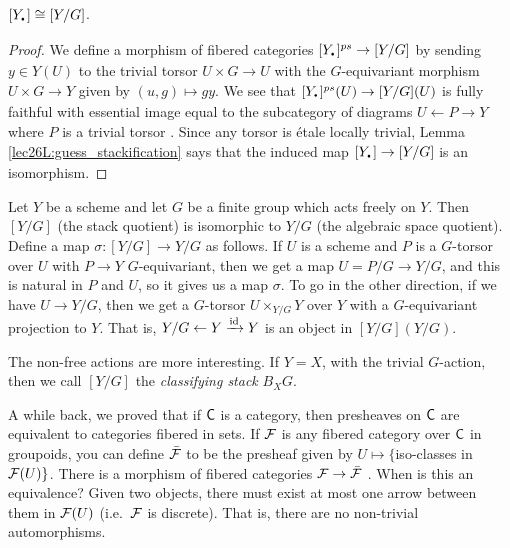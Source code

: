 \begin{proposition}
   $[Y_\udot]\cong [Y/G]$.
 \end{proposition}
 \begin{proof}
   We define a morphism of fibered categories $[Y_\udot]^{ps}\to [Y/G]$ by sending $y\in
   Y(U)$ to the trivial torsor $U\times G\to U$ with the $G$-equivariant morphism
   $U\times G\to Y$ given by $(u,g)\mapsto gy$. We see that $[Y_\udot]^{ps}(U)\to
   [Y/G](U)$ is fully faithful with essential image equal to the subcategory of diagrams
   $U\leftarrow P\to Y$ where $P$ is a trivial torsor . Since any torsor
   is \'etale locally trivial, Lemma \ref{lec26L:guess_stackification} says that the
   induced map $[Y_\udot]\to [Y/G]$ is an isomorphism.
 \end{proof}

%

 \begin{example}
   Let $Y$ be a scheme and let $G$ be a finite group which acts freely on $Y$. Then
   $[Y/G]$ (the stack quotient) is isomorphic to $Y/G$ (the algebraic space quotient).
   Define a map $\sigma:[Y/G]\to Y/G$ as follows. If $U$ is a scheme and $P$ is a
   $G$-torsor over $U$ with $P\to Y$ $G$-equivariant, then we get a map $U=P/G\to Y/G$,
   and this is natural in $P$ and $U$, so it gives us a map $\sigma$. To go in the other
   direction, if we have $U\to Y/G$, then we get a $G$-torsor $U\times_{Y/G} Y$ over $Y$
   with a $G$-equivariant projection to $Y$. That is, $Y/G\leftarrow Y\xrightarrow{\operatorname{id}} Y$
   is an object in $[Y/G](Y/G)$.
 \end{example}
 \begin{example}
   The non-free actions are more interesting. If $Y=X$, with the trivial
   $G$-action, then we call $[Y/G]$ the \emph{classifying stack} $B_X G$.
 \end{example}
 A while back, we proved that if $\text{\sf C}$ is a category, then presheaves on $\text{\sf C}$ are
 equivalent to categories fibered in sets. If $\mathcal{F}$ is any fibered category over $\text{\sf C}$ in
 groupoids, you can define $\bar{\mathcal{F}}$ to be the presheaf given by $U\mapsto\{$iso-classes
 in $\mathcal{F}(U)\}$. There is a morphism of fibered categories $\mathcal{F}\to \bar{\mathcal{F}}$ \anton{}. When is
 this an equivalence? Given two objects, there must exist at most one arrow between them
 in $\mathcal{F}(U)$ (i.e.~$\mathcal{F}$ is discrete). That is, there are no non-trivial automorphisms.

